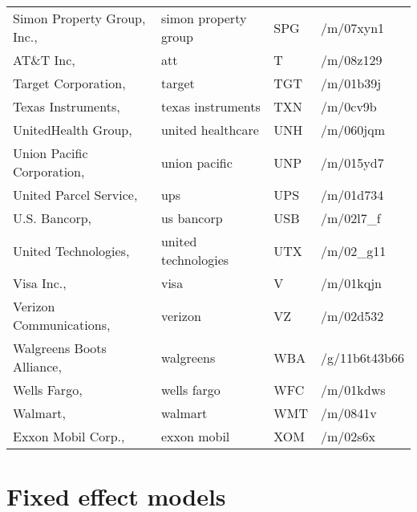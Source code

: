 \begin{longtable}[c]{llll}
Simon Property Group, Inc., & simon property group & SPG & /m/07xyn1 \\
AT\&T Inc, & att & T & /m/08z129 \\
Target Corporation, & target & TGT & /m/01b39j \\
Texas Instruments, & texas instruments & TXN & /m/0cv9b \\
UnitedHealth Group, & united healthcare & UNH & /m/060jqm \\
Union Pacific Corporation, & union pacific & UNP & /m/015yd7 \\
United Parcel Service, & ups & UPS & /m/01d734 \\
U.S. Bancorp, & us bancorp & USB & /m/02l7\_f \\
United Technologies, & united technologies & UTX & /m/02\_g11 \\
Visa Inc., & visa & V & /m/01kqjn \\
Verizon Communications, & verizon & VZ & /m/02d532 \\
Walgreens Boots Alliance, & walgreens & WBA & /g/11b6t43b66 \\
Wells Fargo, & wells fargo & WFC & /m/01kdws \\
Walmart, & walmart & WMT & /m/0841v \\
Exxon Mobil Corp., & exxon mobil & XOM & /m/02s6x
\end{longtable}


\section{Fixed effect models}

